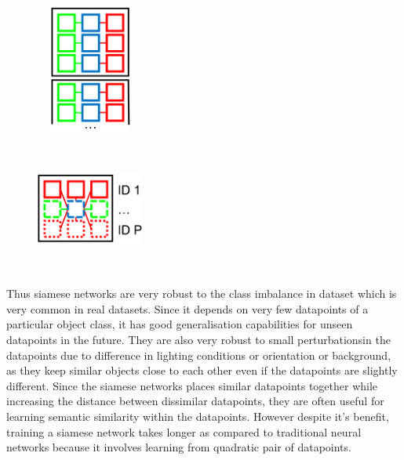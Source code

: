 \begin{figure}
  \centering
  \begin{minipage}[t]{.45\textwidth}
    \centering
    \includegraphics[width=100pt,height=120pt]{pictures/offline_triplet.jpg}
    \label{fig:offline_triplet}
  \end{minipage}%
  \hspace{1cm}
  \begin{minipage}[t]{.45\textwidth}
    \centering
    \includegraphics[width=100pt,height=120pt]{pictures/online_triplet.jpg}
    \label{fig:online_triplet}
  \end{minipage}
\end{figure}
Thus siamese networks are very robust to the class imbalance in dataset which is very common in real datasets. Since it depends on very few datapoints of a particular object class, it has good generalisation capabilities for unseen datapoints in the future. They are also very robust to small perturbationsin the datapoints due to difference in lighting conditions or orientation or background, as they keep similar objects close to each other even if the datapoints are slightly different. Since the siamese networks places similar datapoints together while increasing the distance between dissimilar datapoints, they are often useful for learning semantic similarity within the datapoints. However despite it's benefit, training a siamese network takes longer as compared to traditional neural networks because it involves learning from quadratic pair of datapoints.\cite*{siamese_network}
